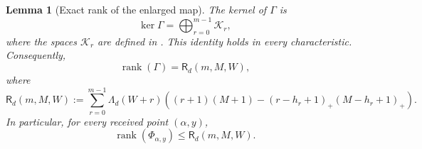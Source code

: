 \documentclass[11pt,letterpaper]{article}
\newtheorem{lemma}[lemma]{Lemma}
\theoremstyle{definition}
\newcommand{\rank}{\operatorname{rank}}
\newcommand{\positive}[1]{\left(#1\right)_{+}}
\begin{document}
\begin{lemma}[Exact rank of the enlarged map]
\label{lem:exact-local-rank}
The kernel of \(\Gamma\) is
\begin{equation}
  \ker\Gamma
  =
  \bigoplus_{r=0}^{m-1}\mathcal K_r,
  \label{eq:exact-gamma-kernel}
\end{equation}
where the spaces \(\mathcal K_r\) are defined in
.  This identity holds in every characteristic.
Consequently,
\begin{equation}
  \rank(\Gamma)
  =
  \mathsf R_d(m,M,W),
  \label{eq:exact-gamma-rank}
\end{equation}
where
\begin{equation}
  \mathsf R_d(m,M,W)
  :=
  \sum_{r=0}^{m-1}\Lambda_d(W+r)
  \left(
    (r+1)(M+1)
    -\positive{r-h_r+1}\positive{M-h_r+1}
  \right).
  \label{eq:exact-local-rank}
\end{equation}
In particular, for every received point
\((\alpha,y)\),
\begin{equation}
  \rank(\Phi_{\alpha,y})
  \leq
  \mathsf R_d(m,M,W).
  \label{eq:local-rank-bound}
\end{equation}
\end{lemma}
\end{document}
